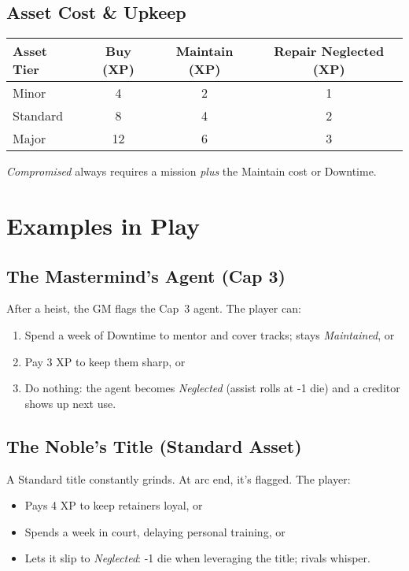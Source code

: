 \documentclass[12pt]{article}
\begin{document}
\subsection*{Asset Cost \& Upkeep}
\begin{center}
\begin{tabular}{lccc}
\toprule
\textbf{Asset Tier} & \textbf{Buy (XP)} & \textbf{Maintain (XP)} & \textbf{Repair Neglected (XP)} \\
\midrule
Minor & 4 & 2 & 1 \\
Standard & 8 & 4 & 2 \\
Major & 12 & 6 & 3 \\
\bottomrule
\end{tabular}
\end{center}
\noindent
\emph{Compromised} always requires a mission \emph{plus} the Maintain cost or Downtime.

\section{Examples in Play}

\subsection*{The Mastermind’s Agent (Cap 3)}
After a heist, the GM flags the Cap~3 agent. The player can:
\begin{enumerate}
  \item Spend a week of Downtime to mentor and cover tracks; stays \emph{Maintained}, or
  \item Pay 3 XP to keep them sharp, or
  \item Do nothing: the agent becomes \emph{Neglected} (assist rolls at -1 die) and a creditor shows up next use.
\end{enumerate}

\subsection*{The Noble’s Title (Standard Asset)}
A Standard title constantly grinds. At arc end, it’s flagged. The player:
\begin{itemize}
  \item Pays 4 XP to keep retainers loyal, or
  \item Spends a week in court, delaying personal training, or
  \item Lets it slip to \emph{Neglected}: -1 die when leveraging the title; rivals whisper.
\end{itemize}
\end{document}
